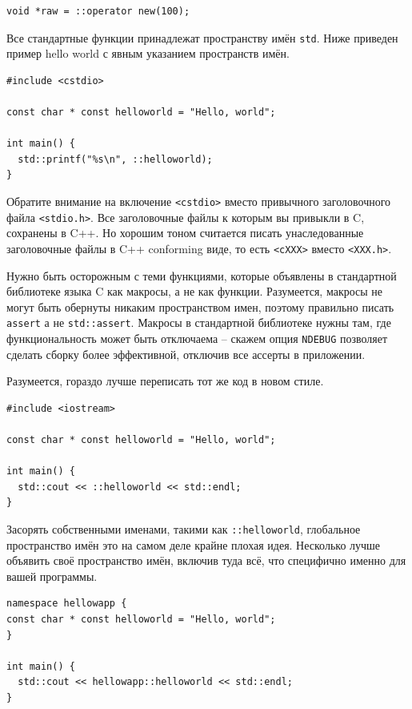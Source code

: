 \documentclass[a4paper,12pt,oneside]{book}
\begin{document}
\begin{lstlisting}
void *raw = ::operator new(100);
\end{lstlisting}

Все стандартные функции принадлежат пространству имён \lstinline!std!. Ниже приведен пример hello world с явным указанием пространств имён.

\begin{lstlisting}
#include <cstdio>

const char * const helloworld = "Hello, world";

int main() {
  std::printf("%s\n", ::helloworld);
}
\end{lstlisting}

Обратите внимание на включение \lstinline!<cstdio>! вместо привычного заголовочного файла \lstinline!<stdio.h>!. Все заголовочные файлы к которым вы привыкли в C, сохранены в C++. Но хорошим тоном считается писать унаследованные заголовочные файлы в C++ conforming виде, то есть \lstinline!<cXXX>! вместо \lstinline!<XXX.h>!.

Нужно быть осторожным с теми функциями, которые объявлены в стандартной библиотеке языка C как макросы, а не как функции. Разумеется, макросы не могут быть обернуты никаким пространством имен, поэтому правильно писать \lstinline!assert! а не \lstinline!std::assert!. Макросы в стандартной библиотеке нужны там, где функциональность может быть отключаема -- скажем опция \lstinline!NDEBUG! позволяет сделать сборку более эффективной, отключив все ассерты в приложении. 

Разумеется, гораздо лучше переписать тот же код в новом стиле.

\begin{lstlisting}
#include <iostream>

const char * const helloworld = "Hello, world";

int main() {
  std::cout << ::helloworld << std::endl;
}
\end{lstlisting}

Засорять собственными именами, такими как \lstinline!::helloworld!, глобальное пространство имён это на самом деле крайне плохая идея. Несколько лучше объявить своё пространство имён, включив туда всё, что специфично именно для вашей программы.

\begin{lstlisting}
namespace hellowapp {
const char * const helloworld = "Hello, world";
}

int main() {
  std::cout << hellowapp::helloworld << std::endl;
}
\end{lstlisting}
\end{document}

